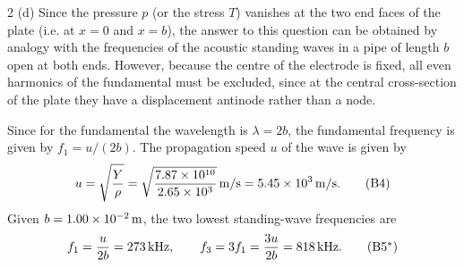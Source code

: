 \begin{solution}{2}
(d) Since the pressure $p$ (or the stress $T$) vanishes at the two end faces of the plate (i.e. at $x=0$ and $x=b$), the answer to this question can be obtained by analogy with the frequencies of the acoustic standing waves in a pipe of length $b$ open at both ends. However, because the centre of the electrode is fixed, all even harmonics of the fundamental must be excluded, since at the central cross-section of the plate they have a displacement antinode rather than a node.

Since for the fundamental the wavelength is $\lambda=2b$, the fundamental frequency is given by $f_1=u/(2b)$. The propagation speed $u$ of the wave is given by
\begin{equation}
u=\sqrt{\frac{Y}{\rho}}=\sqrt{\frac{7.87\times10^{10}}{2.65\times10^{3}}}\,\mathrm{m/s}=5.45\times10^{3}\,\mathrm{m/s}. \tag{B4}
\end{equation}
Given $b=1.00\times10^{-2}\,\mathrm{m}$, the two lowest standing-wave frequencies are
\begin{equation}
f_1=\frac{u}{2b}=273\unitv{kHz},\qquad
f_3=3f_1=\frac{3u}{2b}=818\unitv{kHz}. \tag{B5$^{*}$}
\end{equation}

\end{solution}
